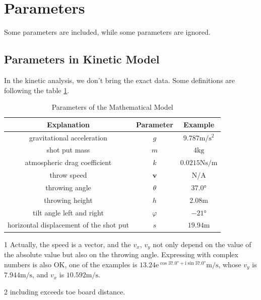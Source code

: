\documentclass{article}
\begin{document}
\section{Parameters}

\label{section:parameters}

Some parameters are included, while some parameters are ignored.

\subsection{Parameters in Kinetic Model}

\label{subsection:parameters-in-kinetic-model}

In the kinetic analysis, we don't bring the exact data. Some definitions are following the table \ref{table:parameters}.

\begin{table}[H]
    \centering
    \begin{threeparttable}
        \begin{tabular}{ccc}
            \hline
            \textbf{Explanation} & \textbf{Parameter} & \textbf{Example} \\
            \hline
            gravitational acceleration & $g$ & $9.787\si{\meter/\second^2}$ \\
            shot put mass & $m$ & $4\si{\kilo\gram}$ \\
            atmospheric drag coefficient & $k$ & $0.0215\si{\newton\second/\meter}$ \\
            throw speed & $\boldsymbol{v}$ & N/A \tnote{1} \\
            throwing angle & $\theta$ & $37.0\si{\degree}$ \\
            throwing height & $h$ & $2.08\si{\meter}$ \\
            tilt angle left and right & $\varphi$ & $-21\si{\degree}$ \\
            horizontal displacement of the shot put \tnote{2} & $s$ & $19.94\si{\meter}$ \\
            \hline
        \end{tabular}
        \begin{tablenotes}
            \item [1] Actually, the speed is a vector, and the $v_x$, $v_y$ not only depend on the value of the absolute value but also on the throwing angle. Expressing with complex numbers is also OK, one of the examples is $13.24\mathrm{e}^{\cos37.0\si{\degree}+\mathrm{i}\sin37.0\si{\degree}}\si{\meter/\second}$, whose $v_y$ is $7.944\si{\meter/\second}$, and $v_x$ is $10.592\si{\meter/\second}$.
            \item [2] including exceeds toe board distance.
        \end{tablenotes}
    \end{threeparttable}
    \caption{Parameters of the Mathematical Model}
    \label{table:parameters}
\end{table}
\end{document}

